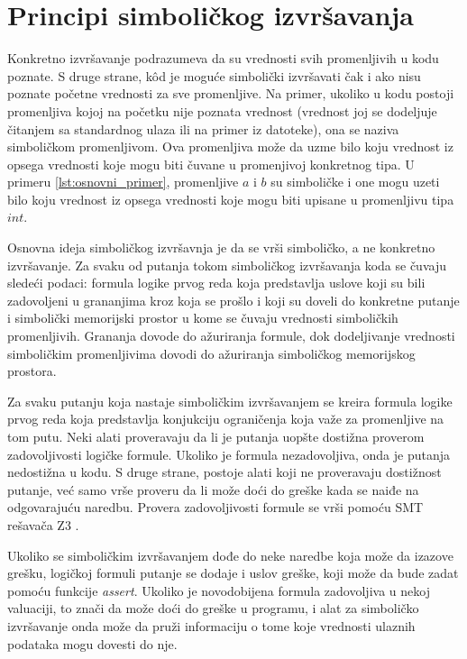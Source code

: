 \documentclass[12pt,oneside]{memoir}
\begin{document}
\section{Principi simboličkog izvršavanja}

Konkretno izvršavanje podrazumeva da su vrednosti svih promenljivih u kodu poznate. S druge strane, k\^od je moguće simbolički izvršavati čak i ako nisu poznate početne vrednosti za sve promenljive. Na primer, ukoliko u kodu postoji promenljiva kojoj na početku nije poznata vrednost (vrednost joj se dodeljuje čitanjem sa standardnog ulaza ili na primer iz datoteke), ona se naziva simboličkom  promenljivom. Ova promenljiva može da uzme bilo koju vrednost iz opsega vrednosti koje mogu biti čuvane u promenjivoj konkretnog tipa. U primeru \ref{lst:osnovni_primer}, promenljive $a$ i $b$ su simboličke i one mogu uzeti bilo koju vrednost iz opsega vrednosti koje mogu biti upisane u promenljivu tipa $int$.

\indent Osnovna ideja simboličkog izvršavnja je da se vrši simboličko, a ne konkretno izvršavanje. Za svaku od putanja tokom simboličkog izvršavanja koda se čuvaju sledeći podaci: formula logike prvog reda koja predstavlja uslove koji su bili zadovoljeni u grananjima kroz koja se prošlo i koji su doveli do konkretne putanje i simbolički memorijski prostor u kome se čuvaju vrednosti simboličkih promenljivih. Grananja dovode do ažuriranja formule, dok dodeljivanje vrednosti simboličkim promenljivima dovodi do ažuriranja simboličkog memorijskog prostora. 

\indent Za svaku putanju koja nastaje simboličkim izvršavanjem se kreira formula logike prvog reda koja predstavlja konjukciju ograničenja koja važe za promenljive na tom putu. Neki alati proveravaju da li je putanja uopšte dostižna proverom zadovoljivosti logičke formule. Ukoliko je formula nezadovoljiva, onda je putanja nedostižna u kodu. S druge strane, postoje alati koji ne proveravaju dostižnost putanje, već samo vrše proveru da li može doći do greške kada se naiđe na odgovarajuću naredbu. Provera zadovoljivosti formule se vrši pomoću SMT rešavača \cite{SMT} Z3 \cite{Z3}. 

Ukoliko se simboličkim izvršavanjem dođe do neke naredbe koja može da izazove grešku, logičkoj formuli putanje se dodaje i uslov greške, koji može da bude zadat pomoću funkcije \textit{assert}. Ukoliko je novodobijena formula zadovoljiva u nekoj valuaciji, to znači da može doći do greške u programu, i alat za simboličko izvršavanje onda može da pruži informaciju o tome koje vrednosti ulaznih podataka mogu dovesti do nje.
\end{document}
